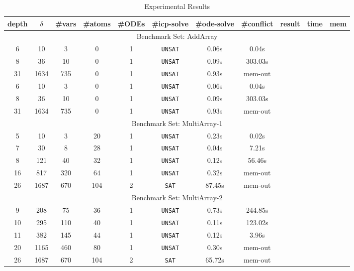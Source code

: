 \begin{center}
\begin{table}[h]
\centering
\begin{tabular}{||c|c|| c| c| c||c|c|c||c|c|c||}
\hline
depth & $\delta$ & \#vars  &\#atoms &\#ODEs &\#icp-solve &
\#ode-solve& \#conflict & result & time & mem \\
\hline
\multicolumn{11}{|c|}{Benchmark Set: AddArray} \\
\hline
 6 & 10 & 3 & 0  & 1& {\tt UNSAT}& 0.06s &0.04s\\
 8 & 36 & 10 & 0 & 1 &{\tt UNSAT}& 0.09s &303.03s \\
 31 & 1634 & 735 & 0 & 1& {\tt UNSAT}& 0.93s & mem-out \\
 6 & 10 & 3 & 0  & 1& {\tt UNSAT}& 0.06s &0.04s\\
 8 & 36 & 10 & 0 & 1 &{\tt UNSAT}& 0.09s &303.03s \\
 31 & 1634 & 735 & 0 & 1& {\tt UNSAT}& 0.93s & mem-out \\
\hline
\multicolumn{11}{|c|}{Benchmark Set: MultiArray-1} \\
\hline
 5 & 10 & 3 & 20 & 1&{\tt UNSAT}& 0.23s  & 0.02s   \\
 7 & 30 & 8 & 28 & 1 &{\tt UNSAT}& 0.04s & 7.21s   \\
 8 & 121 & 40 & 32 &1 &{\tt UNSAT}& 0.12s & 56.46s   \\
 16 & 817 & 320 & 64 & 1 &{\tt UNSAT}& 0.32s  & mem-out\\
26 & 1687 & 670 & 104 & 2 &{\tt SAT} & 87.45s & mem-out\\
\hline
\multicolumn{11}{|c|}{Benchmark Set: MultiArray-2} \\
\hline
 9 & 208 & 75 & 36 & 1 &{\tt UNSAT}& 0.73s & 244.85s \\
 10 & 295 & 110 & 40 & 1 &{\tt UNSAT}& 0.11s & 123.02s \\
 11 & 382 & 145 & 44 & 1 &{\tt UNSAT}& 0.12s & 3.96s \\
 20 & 1165 & 460 & 80 & 1 &{\tt UNSAT}& 0.30s & mem-out  \\
26 & 1687 & 670 & 104 & 2 &{\tt SAT} & 65.72s & mem-out \\
\hline
\end{tabular}
\caption{Experimental Results}
\end{table}
\end{center}


